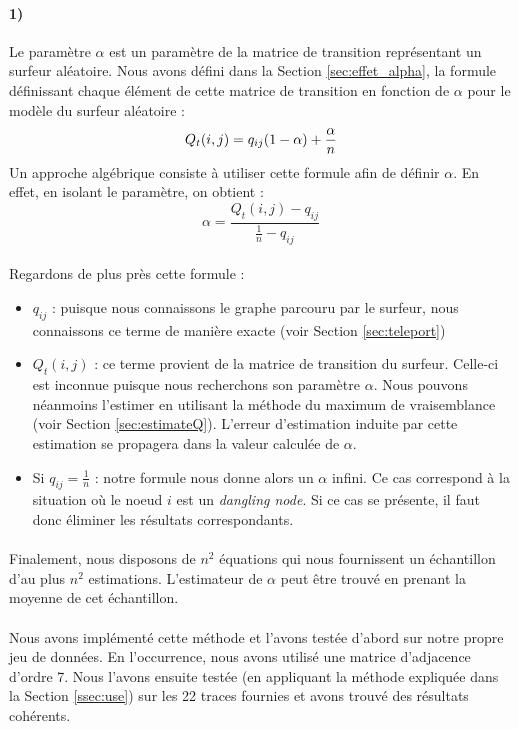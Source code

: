 \documentclass[a4paper,titlepage]{report}
\begin{document}
\paragraph{1)} Le paramètre $\alpha$ est un paramètre de la matrice de transition représentant un surfeur aléatoire. Nous avons défini dans la Section \ref{sec:effet_alpha}, la formule définissant chaque élément de cette matrice de transition en fonction de $\alpha$ pour le modèle du surfeur aléatoire : 
\[
Q_t(i,j) = q_{ij} (1 - \alpha) + \dfrac{\alpha}{n}\\
\]
Un approche algébrique consiste à utiliser cette formule afin de définir $\alpha$. En effet, en isolant le paramètre, on obtient :
\[
	\alpha = \dfrac{Q_t(i,j) - q_{ij}}{\frac{1}{n} - q_{ij}}
\]
\paragraph{}
Regardons de plus près cette formule : 
\begin{itemize}
	\item $q_{ij}$ : puisque nous connaissons le graphe parcouru par le surfeur, nous connaissons ce terme de manière exacte (voir Section \ref{sec:teleport})
	\item $Q_t(i,j)$ : ce terme provient de la matrice de transition du surfeur. Celle-ci est inconnue puisque nous recherchons son paramètre $\alpha$. Nous pouvons néanmoins l'estimer en utilisant la méthode du maximum de vraisemblance (voir Section \ref{sec:estimateQ}). L'erreur d'estimation induite par cette estimation se propagera dans la valeur calculée de $\alpha$.
	\item Si $q_{ij} = \frac{1}{n}$ : notre formule nous donne alors un $\alpha$ infini. Ce cas correspond à la situation où le noeud $i$ est un \textit{dangling node}. Si ce cas se présente, il faut donc éliminer les résultats correspondants.
\end{itemize} 
\paragraph{}
Finalement, nous disposons de $n^2$ équations qui nous fournissent un échantillon d'au plus $n^2$ estimations. L'estimateur de $\alpha$ peut être trouvé en prenant la moyenne de cet échantillon. 
\paragraph{}
Nous avons implémenté cette méthode et l'avons testée d'abord sur notre propre jeu de données. En l'occurrence, nous avons utilisé une matrice d'adjacence d'ordre 7. Nous l'avons ensuite testée (en appliquant la méthode expliquée dans la Section \ref{ssec:use}) sur les 22 traces fournies et avons trouvé des résultats cohérents. 
\end{document}
